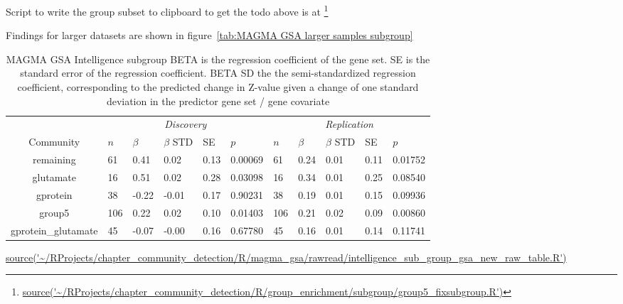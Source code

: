 Script to write the group subset to clipboard to get the todo above is at \footnote{\tiny\url{source('~/RProjects/chapter_community_detection/R/group_enrichment/subgroup/group5_fixsubgroup.R')}}



Findings for larger datasets are shown in figure~\ref{tab:MAGMA GSA larger samples subgroup}
\begin{table}[ht]
\centering
\setlength{\extrarowheight}{2pt}
\begin{adjustbox}{width=\textwidth}
\begin{tabular}{cllllllllll}
  \toprule
   &  \multicolumn{5}{c}{\textit{Discovery}} & \multicolumn{5}{c}{\textit{Replication}} \\
    \cmidrule{2-11}
Community & $n$ & $\beta$ & $\beta$ STD & SE & $p$ & $n$ & $\beta$ & $\beta$ STD & SE & $p$\\ 
  \midrule
remaining & 61 & 0.41 & 0.02 & 0.13 & 0.00069 & 61 & 0.24 & 0.01 & 0.11 & 0.01752 \\ 
  glutamate & 16 & 0.51 & 0.02 & 0.28 & 0.03098 & 16 & 0.34 & 0.01 & 0.25 & 0.08540 \\ 
  gprotein & 38 & -0.22 & -0.01 & 0.17 & 0.90231 & 38 & 0.19 & 0.01 & 0.15 & 0.09936 \\ 
  group5 & 106 & 0.22 & 0.02 & 0.10 & 0.01403 & 106 & 0.21 & 0.02 & 0.09 & 0.00860 \\ 
  gprotein\_glutamate & 45 & -0.07 & -0.00 & 0.16 & 0.67780 & 45 & 0.16 & 0.01 & 0.14 & 0.11741 \\ 
   \bottomrule
  
\end{tabular}
\end{adjustbox}
\caption{MAGMA GSA Intelligence subgroup  BETA is the regression coefficient of the gene set. SE is the standard error of the regression coefficient. BETA SD the the semi-standardized regression coefficient, corresponding to the predicted
change in Z-value given a change of one standard deviation in the predictor gene set / gene covariate } 
\tiny\url{source('~/RProjects/chapter_community_detection/R/magma_gsa/rawread/intelligence_sub_group_gsa_new_raw_table.R')}
\label{tab:MAGMA GSA Intelligence sub}
\end{table}

